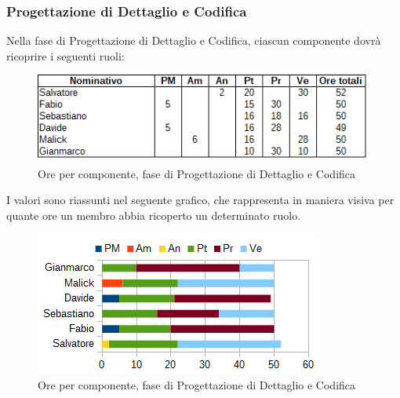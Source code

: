		\subsubsection{Progettazione di Dettaglio e Codifica}
		Nella fase di Progettazione di Dettaglio e Codifica, ciascun componente dovrà ricoprire i seguenti ruoli: \\
		\begin{figure}[H]
			\centering
			\includegraphics[scale=0.75]{immagini/tabelle/progettazione_dettaglio_codifica.png}
			\caption{Ore per componente, fase di Progettazione di Dettaglio e Codifica}
		\end{figure}
		I valori sono riassunti nel seguente grafico, che rappresenta in maniera visiva per quante ore un membro abbia ricoperto un determinato ruolo. \\
		\begin{figure}[H]
			\centering
			\includegraphics[scale=1]{immagini/grafici/progettazione_dettaglio_codifica-barra.png}
			\caption{Ore per componente, fase di Progettazione di Dettaglio e Codifica}
		\end{figure}
